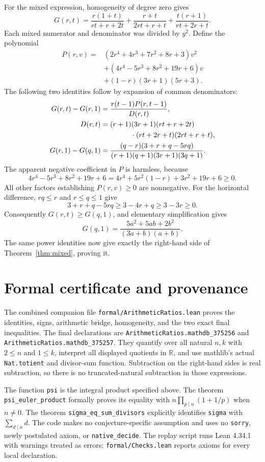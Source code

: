 \documentclass[11pt]{article}
\newcommand{\RR}{\mathbb R}
\begin{document}
For the mixed expression, homogeneity of degree zero gives
\[
 G(r,t)=\frac{r(1+t)}{rt+r+2t}
       +\frac{r+t}{2rt+r+t}
       +\frac{t(r+1)}{rt+2r+t}.
\]
Each mixed numerator and denominator was divided by $y^2$.
Define the polynomial
\begin{align*}
P(r,v)={}&(2r^4+4r^3+7r^2+8r+3)v^2\\
 &+(4r^4-5r^3+8r^2+19r+6)v\\
 &+(1-r)(3r+1)(5r+3).
\end{align*}
The following two identities follow by expansion of common denominators:
\begin{align*}
G(r,t)-G(r,1)
 &=\frac{r(t-1)P(r,t-1)}{D(r,t)},\\
D(r,t)&=(r+1)(3r+1)(rt+r+2t)\\
 &\hspace{15mm}\cdot(rt+2r+t)(2rt+r+t),\\
G(r,1)-G(q,1)
 &=\frac{(q-r)(3+r+q-5rq)}
 {(r+1)(q+1)(3r+1)(3q+1)}.
\end{align*}
The apparent negative coefficient in $P$ is harmless, because
\[
4r^4-5r^3+8r^2+19r+6
=4r^4+5r^2(1-r)+3r^2+19r+6\geq0.
\]
All other factors establishing $P(r,v)\geq0$ are nonnegative.
For the horizontal difference, $rq\leq r$ and $r\leq q\leq1$ give
\[
3+r+q-5rq\geq3-4r+q\geq3-3r\geq0.
\]
Consequently $G(r,t)\geq G(q,1)$, and elementary simplification gives
\[
G(q,1)=\frac{5a^2+5ab+2b^2}{(3a+b)(a+b)}.
\]
The same power identities now give exactly the right-hand side of
Theorem~\ref{thm:mixed}, proving it.

\small
\section{Formal certificate and provenance}
The combined companion file \nolinkurl{formal/ArithmeticRatios.lean} proves the identities, signs,
arithmetic bridge, homogeneity, and the two exact final inequalities.
The final declarations are
\nolinkurl{ArithmeticRatios.mathdb_375256} and
\nolinkurl{ArithmeticRatios.mathdb_375257}.
They quantify over all natural $n,k$ with $2\leq n$ and $1\leq k$,
interpret all displayed quotients in $\RR$, and use mathlib's actual
\nolinkurl{Nat.totient} and divisor-sum function. Subtraction on the
right-hand sides is real subtraction, so there is no truncated-natural
subtraction in those expressions.

The function \nolinkurl{psi} is the integral product specified above.
The theorem \nolinkurl{psi_euler_product} formally proves its equality
with $n\prod_{p\mid n}(1+1/p)$ when $n\ne0$.
The theorem \nolinkurl{sigma_eq_sum_divisors} explicitly identifies
\nolinkurl{sigma} with $\sum_{d\mid n}d$.
The code makes no conjecture-specific assumption and uses no
\nolinkurl{sorry}, newly postulated axiom, or \nolinkurl{native_decide}.
The replay script runs Lean 4.34.1 with warnings treated as errors;
\nolinkurl{formal/Checks.lean} reports axioms for every local declaration.
\end{document}
